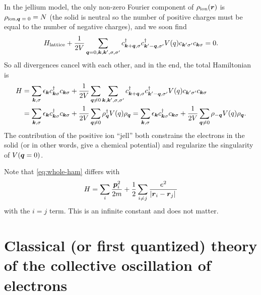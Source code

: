 \documentclass[hyperref, a4paper]{article}
\begin{document}
In the jellium model, the only non-zero Fourier component of $\rho_\text{ion}(\vb*{r})$ is 
$\rho_\text{ion,$\vb*{q}=0$} = N$ (the solid is neutral so the number of positive charges must be equal to 
the number of negative charges), and we soon find 
\[
    H_\text{lattice} + \frac{1}{2V} \sum_{\vb*{q} = 0, \vb*{k}, \vb*{k}', \sigma, \sigma'} c^\dagger_{\vb*{k} + \vb*{q}, \sigma}  c^\dagger_{\vb*{k}' - \vb*{q}, \sigma'} V(q)
    c_{\vb*{k}' \sigma'} c_{\vb*{k} \sigma} = 0.
\]
So all divergences cancel with each other, and in the end, the total Hamiltonian is 
\begin{equation}
    \begin{aligned}
        H &= \sum_{\vb*{k}, \sigma} \epsilon_{\vb*{k}} c^\dagger_{\vb*{k} \sigma} c_{\vb*{k} \sigma} 
        + \frac{1}{2V} \sum_{\vb*{q} \neq 0} \sum_{\vb*{k}, \vb*{k}', \sigma, \sigma'} c^\dagger_{\vb*{k} + \vb*{q}, \sigma}  c^\dagger_{\vb*{k}' - \vb*{q}, \sigma'} V(q)
        c_{\vb*{k}' \sigma'} c_{\vb*{k} \sigma} \\
        &= \sum_{\vb*{k}, \sigma} \epsilon_{\vb*{k}} c^\dagger_{\vb*{k} \sigma} c_{\vb*{k} \sigma} 
        + \frac{1}{2V} \sum_{\vb*{q} \neq 0} \rho^\dagger_{\vb*{q}} V(q) \rho_{\vb*{q}} 
        = \sum_{\vb*{k}, \sigma} \epsilon_{\vb*{k}} c^\dagger_{\vb*{k} \sigma} c_{\vb*{k} \sigma} 
        + \frac{1}{2V} \sum_{\vb*{q} \neq 0} \rho_{-\vb*{q}} V(q) \rho_{\vb*{q}}.
    \end{aligned}
    \label{eq:whole-ham}
\end{equation}
The contribution of the positive ion ``jell'' both constrains the electrons in the solid (or in other words,
give a chemical potential) and regularize the singularity of $V(\vb*{q} = 0)$. 

Note that \eqref{eq:whole-ham} differs with 
\begin{equation}
    H = \sum_{i} \frac{\vb*{p}_i^2}{2m} + \frac{1}{2} \sum_{i \neq j} \frac{e^2}{\abs*{\vb*{r}_i - \vb*{r}_j}}
\end{equation} 
with the $i=j$ term. This is an infinite constant and does not matter. 

\section{Classical (or first quantized) theory of the collective oscillation of electrons} 
\end{document}
